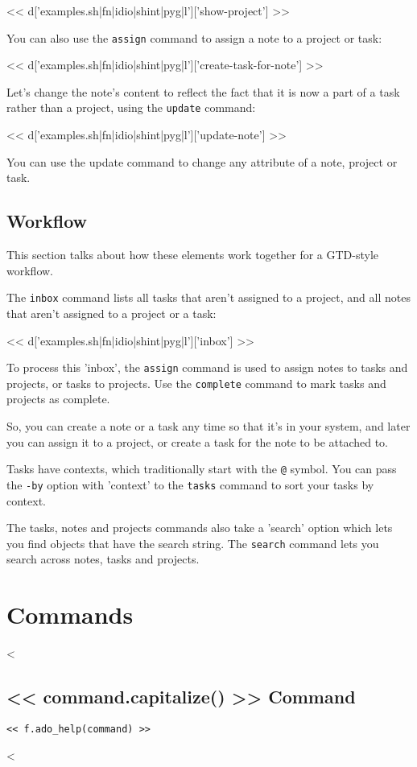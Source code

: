 \documentclass[a4paper]{amsart}
\begin{document}
<< d['examples.sh|fn|idio|shint|pyg|l']['show-project'] >>

You can also use the \verb|assign| command to assign a note to a project or task:

<< d['examples.sh|fn|idio|shint|pyg|l']['create-task-for-note'] >>

Let's change the note's content to reflect the fact that it is now a part of a
task rather than a project, using the \verb|update| command:

<< d['examples.sh|fn|idio|shint|pyg|l']['update-note'] >>

You can use the update command to change any attribute of a note, project or task.

\subsection{Workflow}

This section talks about how these elements work together for a GTD-style workflow.

The \verb|inbox| command lists all tasks that aren't assigned to a project, and
all notes that aren't assigned to a project or a task:

<< d['examples.sh|fn|idio|shint|pyg|l']['inbox'] >>

To process this 'inbox', the \verb|assign| command is used to assign notes to
tasks and projects, or tasks to projects. Use the \verb|complete| command to
mark tasks and projects as complete.

So, you can create a note or a task any time so that it's in your system, and
later you can assign it to a project, or create a task for the note to be
attached to.

Tasks have contexts, which traditionally start with the \verb|@| symbol. You
can pass the \verb|-by| option with 'context' to the \verb|tasks| command to
sort your tasks by context.

The tasks, notes and projects commands also take a 'search' option which lets
you find objects that have the search string. The \verb|search| command lets
you search across notes, tasks and projects.

\section{Commands}

<%
\subsection{<< command.capitalize() >> Command}
\label{subsec:commands:<< command >>}

\begin{Verbatim}
<< f.ado_help(command) >>
\end{Verbatim}
<%
\end{document}
